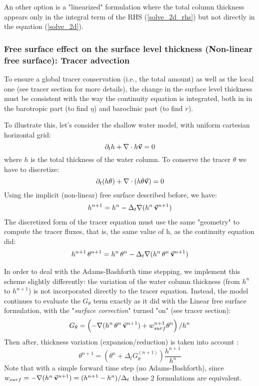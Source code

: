 An other option is a "linearized" formulation where the 
total column thickness appears only in the integral term of 
the RHS (\ref{solve_2d_rhs}) but not directly in 
the equation (\ref{solve_2d}).

\subsubsection{Free surface effect on the surface level thickness
(Non-linear free surface): Tracer advection}

To ensure a global tracer conservation (i.e., the total amount)
as well as the local one (see tracer section for more details), 
the change in the surface level thickness must be consistent with
the way the continuity equation is integrated, both in 
in the barotropic part (to find $\eta$) and baroclinic part
(to find $\dot{r}$).

To illustrate this, let's consider the shallow water model,
with uniform cartesian horizontal grid:
$$
\partial_t h + \nabla \cdot h \vec{\bf v} = 0
$$
where $h$ is the total thickness of the water column.
To conserve the tracer $\theta$ we have to discretize:
$$
\partial_t (h \theta) + \nabla \cdot ( h \theta \vec{\bf v})= 0
$$
Using the implicit (non-linear) free surface described before, we have:
\begin{eqnarray*}
h^{n+1} = h^{n} - \Delta_t \nabla (h^n \, \vec{\bf v}^{n+1} ) \\
\end{eqnarray*}
The discretized form of the tracer equation must use the same
"geometry" to compute the tracer fluxes, that is, the same value of
h, as the continuity equation did:
\begin{eqnarray*}
h^{n+1} \, \theta^{n+1} = h^n \, \theta^n 
        - \Delta_t \nabla (h^n \, \theta^n \, \vec{\bf v}^{n+1})
\end{eqnarray*}

In order to deal with the Adams-Bashforth time stepping,
we implement this scheme slightly differently:
the variation of the water column thickness (from
$h^n$ to $h^{n+1}$)
is not incorporated directly to the tracer equation.
Instead,
the model continues to evaluate the $G_\theta$ term 
exactly as it did with the Linear free surface formulation,
with the "{\it surface correction}" turned "on" (see tracer section):
$$
G_\theta = \left(- \nabla (h^n \, \theta^n \, \vec{\bf v}^{n+1}) 
         + w_{surf}^{n+1} \theta^n \right) / h^n
$$
Then after,
thickness variation (expansion/reduction) is taken into account :
$$
\theta^{n+1} = (\theta^n + \Delta_t G_\theta^{(n+1)}) \frac{h^{n+1}}{h^n}
$$
Note that with a simple forward time step (no Adams-Bashforth), 
since
$
w_{surf} = - \nabla (h^n \, \vec{\bf v}^{n+1} ) = (h^{n+1} - h^{n})
/ \Delta_t
$
those 2 formulations are equivalent. 

